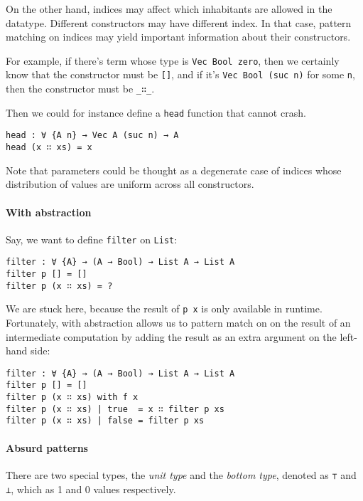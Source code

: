 \documentclass[12pt, a4paper]{article}
\begin{document}
On the other hand, indices may affect which inhabitants are allowed in the
datatype. Different constructors may have different index. In that case, pattern
matching on indices may yield important information about their constructors.

For example, if there's term whose type is {\lstinline|Vec Bool zero|}, then
we certainly know that the constructor must be {\lstinline|[]|}, and if it's
{\lstinline|Vec Bool (suc n)|} for some {\lstinline|n|}, then the constructor
must be {\lstinline|_∷_|}.

Then we could for instance define a {\lstinline|head|} function that cannot crash.

\begin{lstlisting}
head : ∀ {A n} → Vec A (suc n) → A
head (x ∷ xs) = x
\end{lstlisting}

Note that parameters could be thought as a degenerate case of indices whose distribution
of values are uniform across all constructors.

\paragraph{With abstraction}

Say, we want to define {\lstinline|filter|} on {\lstinline|List|}:

\begin{lstlisting}
filter : ∀ {A} → (A → Bool) → List A → List A
filter p [] = []
filter p (x ∷ xs) = ?
\end{lstlisting}

We are stuck here, because the result of {\lstinline|p x|} is only available in
runtime. Fortunately, with abstraction allows us to pattern match on on the result
of an intermediate computation by adding the result as an extra argument on the
left-hand side:

\begin{lstlisting}
filter : ∀ {A} → (A → Bool) → List A → List A
filter p [] = []
filter p (x ∷ xs) with f x
filter p (x ∷ xs) | true  = x ∷ filter p xs
filter p (x ∷ xs) | false = filter p xs
\end{lstlisting}

\paragraph{Absurd patterns}

There are two special types, the \textit{unit type} and the \textit{bottom type},
denoted as {\lstinline|⊤|} and {\lstinline|⊥|}, which as 1 and 0 values respectively.
\end{document}
